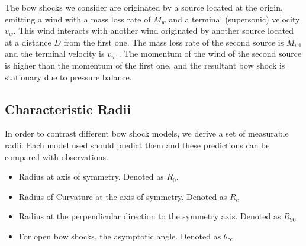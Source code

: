 The bow shocks we consider are originated by a source located at the origin, emitting a wind with a mass loss rate of $\dot{M}_w$ and a terminal
(supersonic) velocity $v_w$. This wind interacts with another wind originated by another source located at a distance $D$ from the first one. 
The mass loss rate of the second source is $\dot{M}_{w1}$ and the terminal velocity is $v_{w1}$. The momentum of the wind of the second source is
higher than the momentum of the first one, and the resultant bow shock is stationary due to pressure balance. 

\subsection{Characteristic Radii}

In order to contrast different bow shock models, we  derive a set of measurable radii. Each model used should predict them and these predictions can be
compared with observations.

\begin{itemize}
\item Radius at axis of symmetry. Denoted as $R_0$. 
\item Radius of Curvature at the axis of symmetry. Denoted as $R_c$
\item Radius at the  perpendicular direction to the symmetry axis. Denoted as $R_{90}$
\item For open bow shocks, the asymptotic angle. Denoted as $\theta_\infty$
\end{itemize} 




